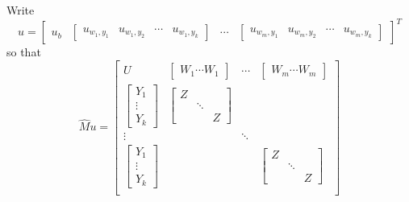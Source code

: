 \documentclass{paper}
\begin{document}
Write \[ 
u = 
\begin{bmatrix}u_b & 
\begin{bmatrix} u_{w_1,y_1} & u_{w_1,y_2} & \cdots & u_{w_1,y_k}   \end{bmatrix} &
\cdots &
\begin{bmatrix} u_{w_m,y_1} & u_{w_m,y_2} & \cdots &  u_{w_m,y_k}   \end{bmatrix}
\end{bmatrix}^T
\]
so that 
\[
\hat{M}u = 
\begin{bmatrix}
	U & \begin{bmatrix}W_1\cdots W_1 \end{bmatrix} & \cdots & \begin{bmatrix}W_m\cdots W_m \end{bmatrix} \\

	\begin{bmatrix} Y_1 \\ \vdots \\ Y_k \end{bmatrix} & \begin{bmatrix} Z \\ & \ddots \\ & & Z \end{bmatrix} \\
	
	\vdots & & \ddots & \\
	
	\begin{bmatrix} Y_1 \\ \vdots \\ Y_k \end{bmatrix} & & & \begin{bmatrix} Z \\ & \ddots \\ & & Z \end{bmatrix} \\
	

\end{bmatrix}\]
\end{document}
